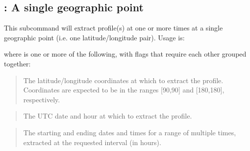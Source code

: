 \documentclass[letterpaper,10pt,english]{sphinxmanual}
\begin{document}
\subsection{: A single geographic point}
\label{\detokenize{userguide:point-a-single-geographic-point}}
\sphinxAtStartPar
This subcommand will extract profile(s) at one or more times at a single geographic point (i.e. one latitude/longitude pair).  Usage is:

\sphinxAtStartPar
{}

\sphinxAtStartPar
where \sphinxcode{\sphinxupquote{{[}flags{]}}} is one or more of the following, with flags that require each other grouped together:

\sphinxAtStartPar
{}

\sphinxAtStartPar
{}
\begin{quote}

\sphinxAtStartPar
The latitude/longitude coordinates at which to extract the profile.  Coordinates are expected to be in the ranges {[}\sphinxhyphen{}90,90{]} and {[}\sphinxhyphen{}180,180{]}, respectively.
\end{quote}

\sphinxAtStartPar
{}

\sphinxAtStartPar
{}
\begin{quote}

\sphinxAtStartPar
The UTC date and hour  at which to extract the profile.
\end{quote}

\sphinxAtStartPar
{}

\sphinxAtStartPar
{}
\begin{quote}

\sphinxAtStartPar
The starting and ending dates and times for a range of multiple times, extracted at the requested interval (in hours).
\end{quote}
\end{document}
